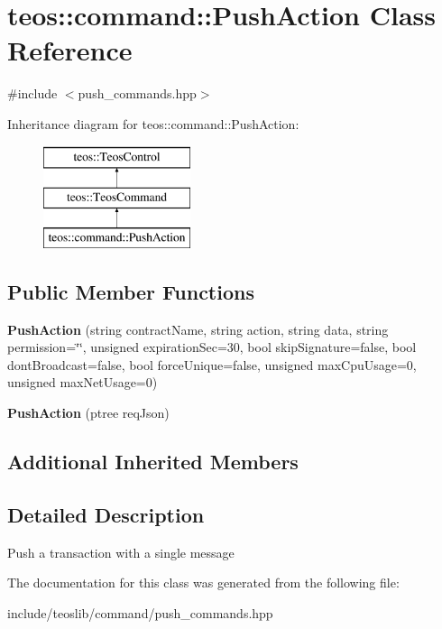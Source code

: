 \hypertarget{classteos_1_1command_1_1_push_action}{}\section{teos\+:\+:command\+:\+:Push\+Action Class Reference}
\label{classteos_1_1command_1_1_push_action}


{\ttfamily \#include $<$push\+\_\+commands.\+hpp$>$}

Inheritance diagram for teos\+:\+:command\+:\+:Push\+Action\+:\begin{figure}[H]
\begin{center}
\leavevmode
\includegraphics[height=3.000000cm]{classteos_1_1command_1_1_push_action}
\end{center}
\end{figure}
\subsection*{Public Member Functions}
\begin{DoxyCompactItemize}
\item 
\mbox{\label{classteos_1_1command_1_1_push_action_a97565647ccfdf55a8e0e5a6d2ed25d32}} 
{\bfseries Push\+Action} (string contract\+Name, string action, string data, string permission=\char`\"{}\char`\"{}, unsigned expiration\+Sec=30, bool skip\+Signature=false, bool dont\+Broadcast=false, bool force\+Unique=false, unsigned max\+Cpu\+Usage=0, unsigned max\+Net\+Usage=0)
\item 
\mbox{\label{classteos_1_1command_1_1_push_action_a8bca4e4fa0586c2d2242a3a50e25cc07}} 
{\bfseries Push\+Action} (ptree req\+Json)
\end{DoxyCompactItemize}
\subsection*{Additional Inherited Members}


\subsection{Detailed Description}
Push a transaction with a single message 

The documentation for this class was generated from the following file\+:\begin{DoxyCompactItemize}
\item 
include/teoslib/command/push\+\_\+commands.\+hpp\end{DoxyCompactItemize}
